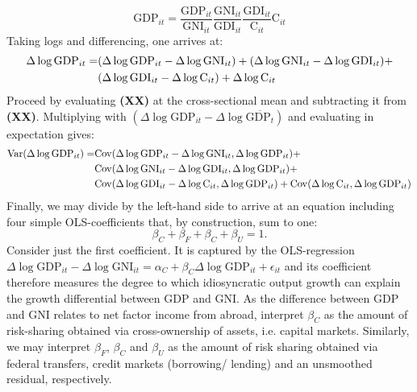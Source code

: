 \documentclass[11pt,a4paper]{article}
\begin{document}
\begin{equation}
    \mathrm{GDP}_{it} = \frac{\mathrm{GDP}_{it}}{\mathrm{GNI}_{it}}\frac{\mathrm{GNI}_{it}}{\mathrm{GDI}_{it}}\frac{\mathrm{GDI}_{it}}{\mathrm{C}_{it}}\mathrm{C}_{it}
\end{equation}
Taking logs and differencing, one arrives at:
\begin{align}
    \Delta \log \mathrm{GDP}_{it} = & (\Delta \log \mathrm{GDP}_{it} - \Delta \log \mathrm{GNI}_{it}) + (\Delta \log \mathrm{GNI}_{it} - \Delta \log \mathrm{GDI}_{it}) + \\
    & (\Delta \log \mathrm{GDI}_{it} - \Delta \log \mathrm{C}_{it}) + \Delta \log \mathrm{C}_{it} \notag
\end{align}
Proceed by evaluating \textbf{(XX)} at the cross-sectional mean and subtracting it from \textbf{(XX)}. Multiplying with $(\Delta \log \mathrm{GDP}_{it} - \Delta \log \overline{\mathrm{GDP}_{t}})$ 
and evaluating in expectation gives:
\begin{align}
    \mathrm{Var}(\Delta \log \mathrm{GDP}_{it}) = & \mathrm{Cov}(\Delta \log \mathrm{GDP}_{it} - \Delta \log \mathrm{GNI}_{it}, \Delta \log \mathrm{GDP}_{it}) + \\
    & \mathrm{Cov}(\Delta \log \mathrm{GNI}_{it} - \Delta \log \mathrm{GDI}_{it}, \Delta \log \mathrm{GDP}_{it}) + \notag \\
    & \mathrm{Cov}(\Delta \log \mathrm{GDI}_{it} - \Delta \log \mathrm{C}_{it}, \Delta \log \mathrm{GDP}_{it}) + \mathrm{Cov}(\Delta \log \mathrm{C}_{it}, \Delta \log \mathrm{GDP}_{it}) \notag
\end{align}
Finally, we may divide by the left-hand side to arrive at an equation including four simple OLS-coefficients that, by construction, sum to one:
\begin{equation}
    \beta_C + \beta_F + \beta_C + \beta_U = 1.
\end{equation}
Consider just the first coefficient. It is captured by the OLS-regression $\Delta \log \mathrm{GDP}_{it} - \Delta \log \mathrm{GNI}_{it}= \alpha_C + \beta_C \Delta \log \mathrm{GDP}_{it} + \epsilon_{it}$ and its coefficient therefore measures the
degree to which idiosyncratic output growth can explain the growth differential between GDP and GNI. As the difference between GDP and GNI relates to net factor income from abroad, \textcite{asy1996} interpret $\beta_C$ as the 
amount of risk-sharing obtained via cross-ownership of assets, i.e. capital markets. Similarly, we may interpret $\beta_F$, $\beta_C$ and $\beta_U$ as the amount of risk sharing obtained via federal transfers, credit markets (borrowing/ lending) and an unsmoothed residual, respectively.\\
\end{document}
